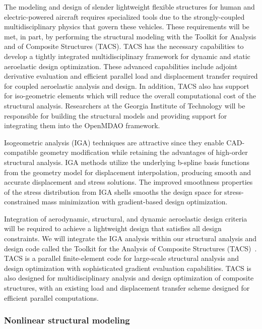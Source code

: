 \documentclass[]{aiaa-tc}
\begin{document}
The modeling and design of slender lightweight flexible structures for
human and electric-powered aircraft requires specialized tools due to
the strongly-coupled multidisciplinary physics that govern these
vehicles. These requirements will be met, in part, by performing the
structural modeling with the Toolkit for Analysis and of Composite
Structures (TACS). TACS has the necessary capabilities to develop a
tightly integrated multidisciplinary framework for dynamic and static
aeroelastic design optimization. These advanced capabilities include
adjoint derivative evaluation and efficient parallel load and
displacement transfer required for coupled aeroelastic analysis and
design.  In addition, TACS also has support for iso-geometric elements
which will reduce the overall computational cost of the structural
analysis. Researchers at the Georgia Institute of Technology will be
responsible for building the structural models and providing support
for integrating them into the OpenMDAO framework.

Isogeometric analysis (IGA) techniques are attractive since they
enable CAD-compatible geometry modification while retaining the
advantages of high-order structural analysis. IGA methods utilize the
underlying b-spline basis functions from the geometry model for
displacement interpolation, producing smooth and accurate displacement
and stress solutions. The improved smoothness properties of the stress
distribution from IGA shells smooths the design space for
stress-constrained mass minimization with gradient-based design
optimization.

Integration of aerodynamic, structural, and dynamic aeroelastic design
criteria will be required to achieve a lightweight design that
satisfies all design constraints. We will integrate the IGA analysis
within our structural analysis and design code called the Toolkit for
the Analysis of Composite Structures
(TACS)~\cite{Kennedy:2014:TACS}. TACS is a parallel finite-element
code for large-scale structural analysis and design optimization with
sophisticated gradient evaluation capabilities. TACS is also designed
for multidisciplinary analysis and design optimization of composite
structures, with an existing load and displacement transfer scheme
designed for efficient parallel computations.

\subsubsection{Nonlinear structural modeling}
\end{document}
